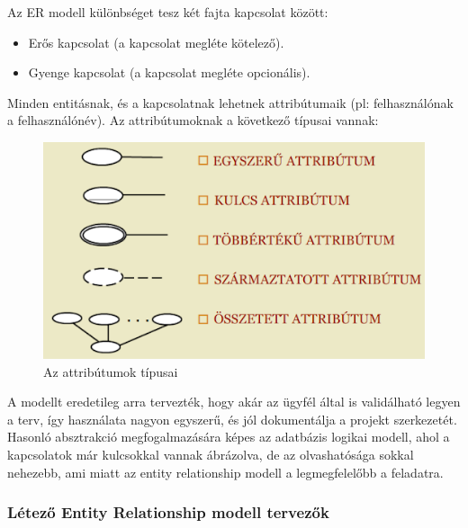 \documentclass[a4paper,12pt,oneside]{report}
\begin{document}
\newpage
\begin{justify}
	Az ER modell különbséget tesz két fajta kapcsolat között:
    
    \begin{itemize}
        \item Erős kapcsolat (a kapcsolat megléte kötelező).
	    \item Gyenge kapcsolat (a kapcsolat megléte opcionális).
    \end{itemize}

	Minden entitásnak, és a kapcsolatnak lehetnek attribútumaik (pl: felhasználónak a felhasználónév). Az attribútumoknak a következő típusai vannak: 

	\begin{figure}[H]
		\includegraphics[width=\textwidth]{contents/images/ermodell_attributes.png}
		\caption{Az attribútumok típusai \cite{book:example_er_attr} }
		\label{fig:ermodell_attributes}
	\end{figure}

	A modellt eredetileg arra tervezték, hogy akár az ügyfél által is validálható legyen a terv, így használata nagyon egyszerű, és jól dokumentálja a projekt szerkezetét. Hasonló absztrakció megfogalmazására képes az adatbázis logikai modell, ahol a kapcsolatok már kulcsokkal vannak ábrázolva, de az olvashatósága sokkal nehezebb, ami miatt az entity relationship modell a legmegfelelőbb a feladatra. 

\end{justify}

\newpage
\subsubsection{Létező Entity Relationship modell tervezők}
\end{document}
